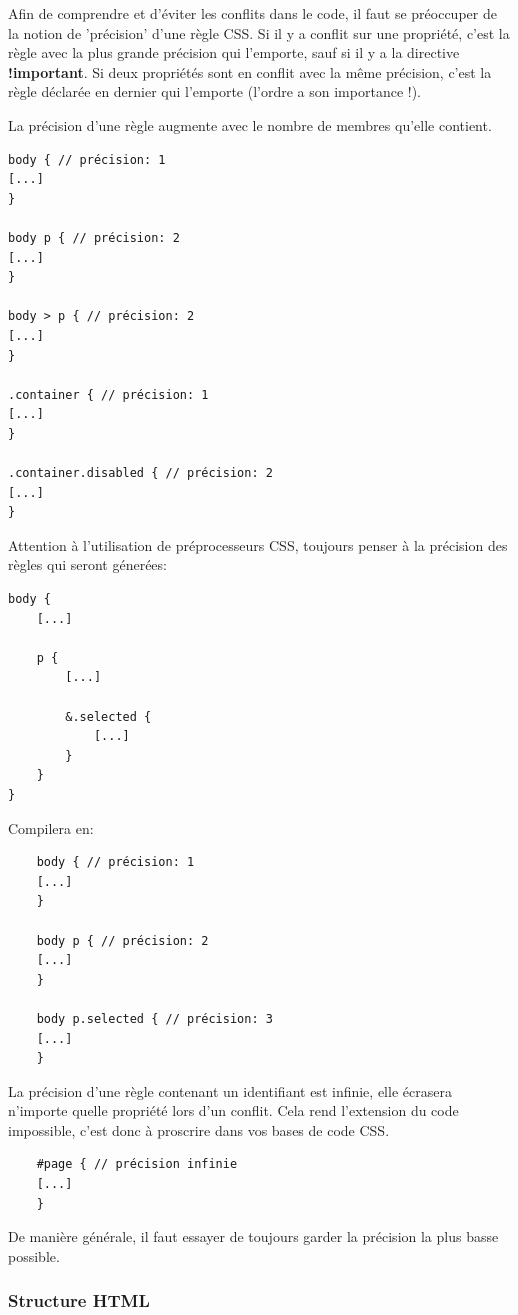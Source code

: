 \documentclass[12pt, a4paper]{report}
\begin{document}
\begin{appendix}
Afin de comprendre et d'éviter les conflits dans le code, il faut se préoccuper de la notion de 'précision' d'une règle CSS.
Si il y a conflit sur une propriété, c'est la règle avec la plus grande précision qui l'emporte, sauf si il y a la directive \textbf{!important}.
Si deux propriétés sont en conflit avec la même précision, c'est la règle déclarée en dernier qui l'emporte (l'ordre a son importance !).

La précision d'une règle augmente avec le nombre de membres qu'elle contient.
\begin{lstlisting}
body { // précision: 1
[...]
}

body p { // précision: 2
[...]
}

body > p { // précision: 2
[...]
}

.container { // précision: 1
[...]
}

.container.disabled { // précision: 2
[...]
}
\end{lstlisting}

Attention à l'utilisation de préprocesseurs CSS, toujours penser à la précision des règles qui seront génerées:
\begin{lstlisting}
body {
    [...]

    p {
        [...]

        &.selected {
            [...]
        }
    }
}
\end{lstlisting}
Compilera en:
\begin{lstlisting}
    body { // précision: 1
    [...]
    }

    body p { // précision: 2
    [...]
    }

    body p.selected { // précision: 3
    [...]
    }
\end{lstlisting}

La précision d'une règle contenant un identifiant est infinie, elle écrasera n'importe quelle propriété lors d'un conflit.
Cela rend l'extension du code impossible, c'est donc à proscrire dans vos bases de code CSS.

\begin{lstlisting}
    #page { // précision infinie
    [...]
    }
\end{lstlisting}

De manière générale, il faut essayer de toujours garder la précision la plus basse possible.


\subsubsection{Structure HTML}


\end{appendix}
\end{document}
